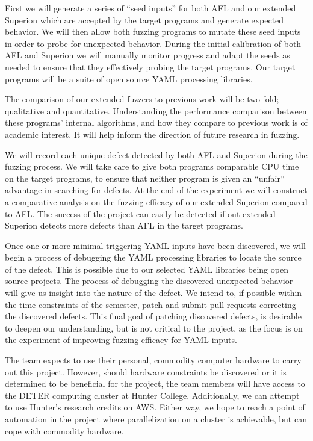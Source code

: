 \documentclass[12pt]{diazessay}
\begin{document}
First we will generate a series of ``seed inputs'' for both AFL and our extended Superion which are accepted by the target programs and generate expected behavior.
We will then allow both fuzzing programs to mutate these seed inputs\cite{Seed} in order to probe for unexpected behavior.
During the initial calibration of both AFL and Superion we will manually monitor progress and adapt the seeds as needed to ensure that they effectively probing the target programs.
Our target programs will be a suite of open source YAML processing libraries.

The comparison of our extended fuzzers to previous work will be two fold; qualitative and quantitative.
Understanding the performance comparison between these programs' internal algorithms, and how they compare to previous work is of academic interest.
It will help inform the direction of future research in fuzzing.




We will record each unique defect detected by both AFL and Superion during the fuzzing process.
We will take care to give both programs comparable CPU time on the target programs, to ensure that neither program is given an ``unfair'' advantage in searching for defects.
At the end of the experiment we will construct a comparative analysis on the fuzzing efficacy of our extended Superion compared to AFL.
The success of the project can easily be detected if out extended Superion detects more defects than AFL in the target programs.

Once one or more minimal triggering YAML inputs have been discovered, we will begin a process of debugging the YAML processing libraries to locate the source of the defect.
This is possible due to our selected YAML libraries being open source projects.
The process of debugging the discovered unexpected behavior will give us insight into the nature of the defect.
We intend to, if possible within the time constraints of the semester, patch and submit pull requests correcting the discovered defects.
This final goal of patching discovered defects, is desirable to deepen our understanding, but is not critical to the project, as the focus is on the experiment of improving fuzzing efficacy for YAML inputs.

The team expects to use their personal, commodity computer hardware to carry out this project.
However, should hardware constraints be discovered or it is determined to be beneficial for the project, the team members will have access to the DETER computing cluster at Hunter College.
Additionally, we can attempt to use Hunter's research credits on AWS.
Either way, we hope to reach a point of automation in the project where parallelization on a cluster is achievable, but can cope with commodity hardware.
\end{document}
